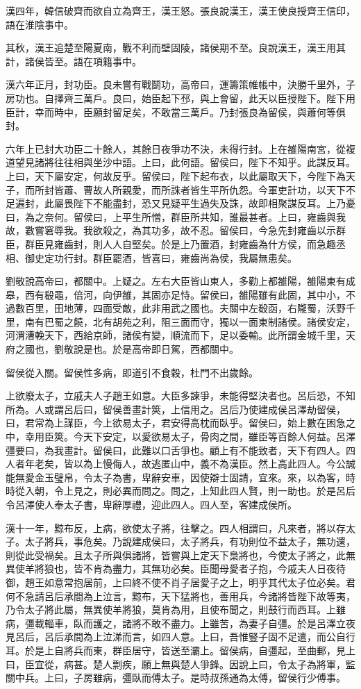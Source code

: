 漢四年，韓信破齊而欲自立為齊王，漢王怒。張良說漢王，漢王使良授齊王信印，語在淮陰事中。

其秋，漢王追楚至陽夏南，戰不利而壁固陵，諸侯期不至。良說漢王，漢王用其計，諸侯皆至。語在項籍事中。

漢六年正月，封功臣。良未嘗有戰鬬功，高帝曰，運籌策帷帳中，決勝千里外，子房功也。自擇齊三萬戶。良曰，始臣起下邳，與上會留，此天以臣授陛下。陛下用臣計，幸而時中，臣願封留足矣，不敢當三萬戶。乃封張良為留侯，與蕭何等俱封。

六年上已封大功臣二十餘人，其餘日夜爭功不決，未得行封。上在雒陽南宮，從複道望見諸將往往相與坐沙中語。上曰，此何語。留侯曰，陛下不知乎。此謀反耳。上曰，天下屬安定，何故反乎。留侯曰，陛下起布衣，以此屬取天下，今陛下為天子，而所封皆蕭、曹故人所親愛，而所誅者皆生平所仇怨。今軍吏計功，以天下不足遍封，此屬畏陛下不能盡封，恐又見疑平生過失及誅，故即相聚謀反耳。上乃憂曰，為之奈何。留侯曰，上平生所憎，群臣所共知，誰最甚者。上曰，雍齒與我故，數嘗窘辱我。我欲殺之，為其功多，故不忍。留侯曰，今急先封雍齒以示群臣，群臣見雍齒封，則人人自堅矣。於是上乃置酒，封雍齒為什方侯，而急趣丞相、御史定功行封。群臣罷酒，皆喜曰，雍齒尚為侯，我屬無患矣。

劉敬說高帝曰，都關中。上疑之。左右大臣皆山東人，多勸上都雒陽，雒陽東有成皋，西有殽黽，倍河，向伊雒，其固亦足恃。留侯曰，雒陽雖有此固，其中小，不過數百里，田地薄，四面受敵，此非用武之國也。夫關中左殽函，右隴蜀，沃野千里，南有巴蜀之饒，北有胡苑之利，阻三面而守，獨以一面東制諸侯。諸侯安定，河渭漕輓天下，西給京師，諸侯有變，順流而下，足以委輸。此所謂金城千里，天府之國也，劉敬說是也。於是高帝即日駕，西都關中。

留侯從入關。留侯性多病，即道引不食穀，杜門不出歲餘。

上欲廢太子，立戚夫人子趙王如意。大臣多諫爭，未能得堅決者也。呂后恐，不知所為。人或謂呂后曰，留侯善畫計筴，上信用之。呂后乃使建成侯呂澤劫留侯，曰，君常為上謀臣，今上欲易太子，君安得高枕而臥乎。留侯曰，始上數在困急之中，幸用臣筴。今天下安定，以愛欲易太子，骨肉之間，雖臣等百餘人何益。呂澤彊要曰，為我畫計。留侯曰，此難以口舌爭也。顧上有不能致者，天下有四人。四人者年老矣，皆以為上慢侮人，故逃匿山中，義不為漢臣。然上高此四人。今公誠能無愛金玉璧帛，令太子為書，卑辭安車，因使辯士固請，宜來。來，以為客，時時從入朝，令上見之，則必異而問之。問之，上知此四人賢，則一助也。於是呂后令呂澤使人奉太子書，卑辭厚禮，迎此四人。四人至，客建成侯所。

漢十一年，黥布反，上病，欲使太子將，往擊之。四人相謂曰，凡來者，將以存太子。太子將兵，事危矣。乃說建成侯曰，太子將兵，有功則位不益太子，無功還，則從此受禍矣。且太子所與俱諸將，皆嘗與上定天下梟將也，今使太子將之，此無異使羊將狼也，皆不肯為盡力，其無功必矣。臣聞母愛者子抱，今戚夫人日夜待御，趙王如意常抱居前，上曰終不使不肖子居愛子之上，明乎其代太子位必矣。君何不急請呂后承間為上泣言，黥布，天下猛將也，善用兵，今諸將皆陛下故等夷，乃令太子將此屬，無異使羊將狼，莫肯為用，且使布聞之，則鼓行而西耳。上雖病，彊載輜車，臥而護之，諸將不敢不盡力。上雖苦，為妻子自彊。於是呂澤立夜見呂后，呂后承間為上泣涕而言，如四人意。上曰，吾惟豎子固不足遣，而公自行耳。於是上自將兵而東，群臣居守，皆送至灞上。留侯病，自彊起，至曲郵，見上曰，臣宜從，病甚。楚人剽疾，願上無與楚人爭鋒。因說上曰，令太子為將軍，監關中兵。上曰，子房雖病，彊臥而傅太子。是時叔孫通為太傅，留侯行少傅事。

